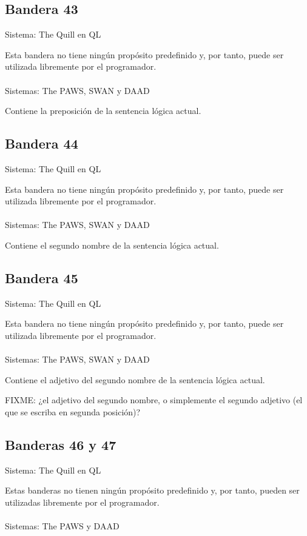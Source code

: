 \documentclass[11pt, a5paper]{article}
\newcommand{\quill}{\textsf{The Quill}\xspace}
\newcommand{\paw}{\textsf{The PAWS}\xspace}
\newcommand{\swan}{\textsf{SWAN}\xspace}
\newcommand{\daad}{\textsf{DAAD}\xspace}
\newcommand{\sistema}[1]{\noindent Sistema: #1 \nopagebreak}
\newcommand{\sistemas}[1]{\noindent Sistemas: #1 \nopagebreak}
\begin{document}
\subsection{Bandera 43}

\sistema{\quill en QL}

Esta bandera no tiene ningún propósito predefinido y, por tanto, puede ser utilizada libremente por el programador.
\\\ \\
\sistemas{\paw, \swan y \daad}

Contiene la preposición de la sentencia lógica actual.

\subsection{Bandera 44}

\sistema{\quill en QL}

Esta bandera no tiene ningún propósito predefinido y, por tanto, puede ser utilizada libremente por el programador.
\\\ \\
\sistemas{\paw, \swan y \daad}

Contiene el segundo nombre de la sentencia lógica actual.

\subsection{Bandera 45}

\sistema{\quill en QL}

Esta bandera no tiene ningún propósito predefinido y, por tanto, puede ser utilizada libremente por el programador.
\\\ \\
\sistemas{\paw, \swan y \daad}

Contiene el adjetivo del segundo nombre de la sentencia lógica actual.

FIXME: ¿el adjetivo del segundo nombre, o simplemente el segundo adjetivo (el que se escriba en segunda posición)?

\subsection{Banderas 46 y 47}

\sistema{\quill en QL}

Estas banderas no tienen ningún propósito predefinido y, por tanto, pueden ser utilizadas libremente por el programador.
\\\ \\
\sistemas{\paw y \daad}
\end{document}
